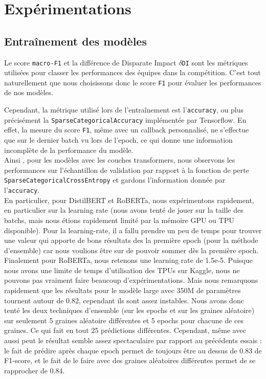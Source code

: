 \chapter{Expérimentations}

\section{Entraînement des modèles}
\label{sec:entrainement}
Le score \texttt{macro-F1} et la différence de Disparate Impact $\delta$\texttt{DI} sont les métriques utilisées pour classer les performances des équipes dans la compétition. C'est tout naturellement que nous choisissons donc le score \texttt{F1} pour évaluer les performances de nos modèles.

Cependant, la métrique utilisé lors de l'entraînement est l'\texttt{accuracy}, ou plus précisément la \texttt{SparseCategoricalAccuracy} implémentée par Tensorflow. En effet, la mesure du score \texttt{F1}, même avec un callback personnalisé, ne s'effectue que sur le dernier batch vu lors de l'epoch, ce qui donne une information incomplète de la performance du modèle.\\
Ainsi , pour les modèles avec les couches transformers, nous observons les performances sur l'échantillon de validation par rapport à la fonction de perte \texttt{SparseCategoricalCrossEntropy} et gardons l'information donnée par l'\texttt{accuracy}.\\

En particulier, pour DistilBERT et RoBERTa, nous expérimentons rapidement, en particulier sur la learning rate (nous avons tenté de jouer sur la taille des batchs, mais nous étions rapidement limité par la mémoire GPU ou TPU disponible). Pour la learning-rate, il a fallu prendre un peu de temps pour trouver une valeur qui apporte de bons résultats des la première epoch (pour la méthode d'ensemble) car nous voulions être sur de pouvoir sommer dès la première epoch. Finalement pour RoBERTa, nous retenons une learning rate de 1.5e-5. Puisque nous avons une limite de temps d'utilisation des TPUs sur Kaggle, nous ne pouvons pas vraiment faire beaucoup d'expérimentations. Mais nous remarquons rapidement que les résultats pour le modèle large avec 350M de paramètres tournent autour de 0.82, cependant ils sont assez instables. Nous avons donc tenté les deux techniques d'ensemble (sur les epochs et sur les graines aléatoire) sur seulement 5 graines aléatoire différentes et 5 epochs pour chacune de ces graines. Ce qui fait en tout 25 prédictions différentes. Cependant, même avec aussi peut le résultat semble assez spectaculaire par rapport au précédents essais : le fait de prédire après chaque epoch permet de toujours être au dessus de 0.83 de F1-score, et le fait de le faire avec des graines aléatoires différentes permet de se rapprocher de 0.84.

